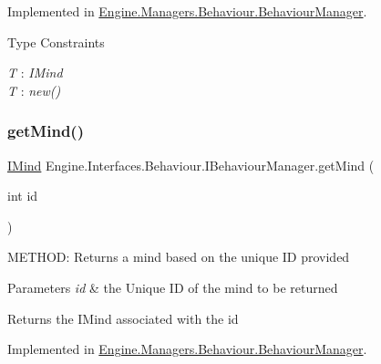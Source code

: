Implemented in \hyperlink{a00486_a13eea511ff6d2cdeb8287b63034ce898}{Engine.\+Managers.\+Behaviour.\+Behaviour\+Manager}.

\begin{Desc}
\item[Type Constraints]\begin{description}
\item[{\em T} : {\em I\+Mind}]\item[{\em T} : {\em new()}]\end{description}
\end{Desc}
\mbox{\label{a00418_ac1d24fb690a665ce8c70671b7c27b9ad}} 
\subsubsection{\texorpdfstring{get\+Mind()}{getMind()}}
{\footnotesize\ttfamily \hyperlink{a00446}{I\+Mind} Engine.\+Interfaces.\+Behaviour.\+I\+Behaviour\+Manager.\+get\+Mind (\begin{DoxyParamCaption}\item[{int}]{id }\end{DoxyParamCaption})}



M\+E\+T\+H\+OD\+: Returns a mind based on the unique ID provided 


\begin{DoxyParams}{Parameters}
{\em id} & the Unique ID of the mind to be returned\\
\hline
\end{DoxyParams}
\begin{DoxyReturn}{Returns}
the I\+Mind associated with the id
\end{DoxyReturn}


Implemented in \hyperlink{a00486_a4391a84eadd13a812977cd51e177e00b}{Engine.\+Managers.\+Behaviour.\+Behaviour\+Manager}.

\mbox{\label{a00418_a6f89adf3a1d8286a73b534855847c414}} 
